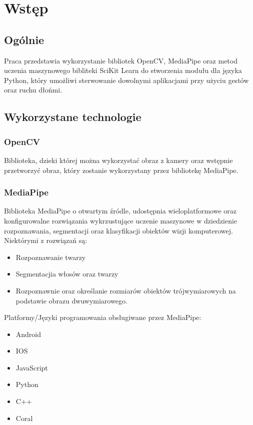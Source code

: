 \chapter{Wstęp}

\section{Ogólnie}

Praca przedstawia wykorzystanie bibliotek OpenCV, MediaPipe oraz metod 
uczenia maszynowego bibliteki SciKit Learn do stworzenia modułu dla 
języka Python, który umożliwi sterwowanie dowolnymi aplikacjami przy 
użyciu gestów oraz ruchu dłońmi. 

\section{Wykorzystane technologie}
\subsection{OpenCV}
Biblioteka, dzieki której można wykorzystać obraz z kamery oraz wstępnie
przetworzyć obraz, który zostanie wykorzystany przez bibliotekę MediaPipe.

\subsection{MediaPipe}

\quad
Biblioteka MediaPipe o otwartym źródle, udostępnia wieloplatformowe oraz 
konfigurowalne rozwiązania wykrzustujące uczenie maszynowe w dziedzienie 
rozpoznawania, segmentacji oraz klasyfikacji obiektów wizji komputerowej. 
Niektórymi z rozwiązań są:

\begin{itemize}[noitemsep]
    \item Rozpoznawanie twarzy
    \item Segmentacjia włosów oraz twarzy
    \item Rozpoznawnie oraz określanie rozmiarów obiektów trójwymiarowych 
          na podstawie obrazu dwuwymiarowego. 
\end{itemize}

Platformy/Języki programowania obsługiwane przez MediaPipe:

\begin{itemize}[noitemsep]
    \item Android
    \item IOS
    \item JavaScript
    \item Python
    \item C++
    \item Coral
\end{itemize}

